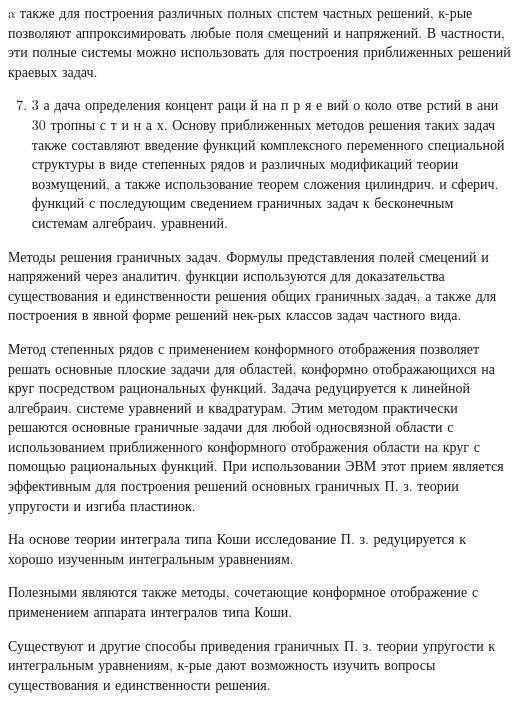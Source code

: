 \documentclass[10pt]{article}
\begin{document}
a также для построения различных полных спстем частных решений, к-рые позволяют аппроксимировать любые поля смещений и напряжений. В частности, эти полные системы можно использовать для построения приближенных решений краевых задач.



\begin{enumerate}

  \setcounter{enumi}{6}

  \item 3 а дача определения концент раци й на п р я е вий о коло отве рстий в ани 30 тропны с т и н а х. Основу приближенных методов решения таких задач также составляют введение функций комплексного переменного специальной структуры в виде степенных рядов и различных модификаций теории возмущений, а также использование теорем сложения цилиндрич. и сферич. функций с последующим сведением граничных задач к бесконечным системам алгебраич. уравнений.

\end{enumerate}



Методы решения граничных задач. Формулы представления полей смецений и напряжений через аналитич. функции используются для доказательства существования и единственности решения общих граничных задач, а также для построения в явной форме решений нек-рых классов задач частного вида.



Метод степенных рядов с применением конформного отображения позволяет решать основные плоские задачи для областей, конформно отображающихся на круг посредством рациональных функций. Задача редуцируется к линейной алгебраич. системе уравнений и квадратурам. Этим методом практически решаются основные граничные задачи для любой односвязной области с использованием приближенного конформного отображения области на круг с помощью рациональных функций. При использовании ЭВМ этот прием является эффективным для построения решений основных граничных П. з. теории упругости и изгиба пластинок.



На основе теории интеграла типа Коши исследование П. з. редуцируется к хорошо изученным интегральным уравнениям.



Полезными являются также методы, сочетающие конформное отображение с применением аппарата интегралов типа Коши.



Существуют и другие способы приведения граничных П. з. теории упругости к интегральным уравнениям, к-рые дают возможность изучить вопросы существования и единственности решения.
\end{document}
